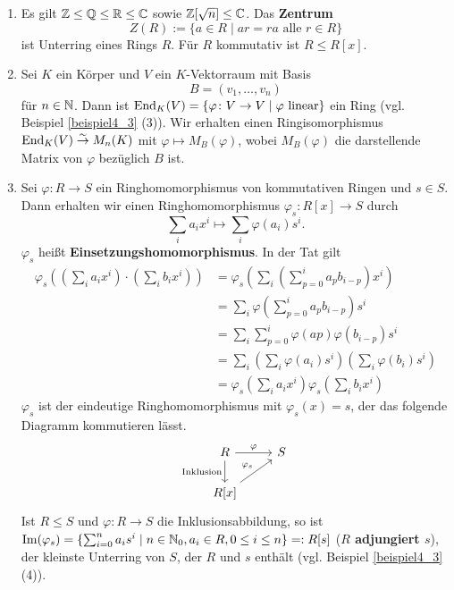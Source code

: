 \begin{beispiel}\label{beispiel4_6}
	\begin{enumerate}[label=(\arabic*)]
		\item Es gilt $\mathbb{Z} \leq \mathbb{Q} \leq \mathbb{R} \leq \mathbb{C}$ sowie $\mathbb{Z}[\sqrt{n}] \leq \mathbb{C}$. Das \textbf{Zentrum} 
		\[Z(R) := \{a \in R \mid ar=ra \text{ alle } r \in R\}\]
		ist Unterring eines Rings $R$. Für $R$ kommutativ ist $R \leq R[x]$.
		\item Sei $K$ ein Körper und $V$ ein $K$-Vektorraum mit Basis
		\[B = (v_1, \dots, v_n)\]
		für $n \in \mathbb{N}$. Dann ist $\mathrm{End}_K(V) = \{\varphi\colon V \to V \mid \varphi \text{ linear}\}$ ein Ring (vgl. Beispiel \ref{beispiel4_3} (3)). Wir erhalten einen Ringisomorphismus $\mathrm{End}_K(V) \overset{\sim}{\to} M_n(K)$ mit $\varphi \mapsto M_B(\varphi)$, wobei $M_B(\varphi)$ die darstellende Matrix von $\varphi$ bezüglich $B$ ist.
		\item Sei $\varphi \colon R \to S$ ein Ringhomomorphismus von kommutativen Ringen und $s \in S$. Dann erhalten wir einen Ringhomomorphismus $\varphi_s \colon R[x] \to S$ durch 
		\[\sum_i a_i x^i \mapsto \sum_i \varphi(a_i)s^i.\]
		$\varphi_s$ heißt \textbf{Einsetzungshomomorphismus}. In der Tat gilt 
		\begin{align*}
			\varphi_s\left( \left(\sum_i a_i x^i\right) \cdot \left(\sum_i b_i x^i\right)\right) &= \varphi_s\left(\sum_i \left(\sum_{p=0}^i a_p b_{i-p}\right)x^i\right)\\
			&= \sum_i \varphi\left(\sum_{p=0}^i a_p b_{i-p}\right) s^i\\
			&= \sum_i \sum_{p=0}^i \varphi(ap)\varphi(b_{i-p}) s^i\\
			&= \sum_i \left(\sum_i \varphi(a_i) s^i\right) \left(\sum_{i} \varphi(b_i) s^i\right)\\
			&= \varphi_s\left(\sum_i a_ix^i\right) \varphi_s\left(\sum_i b_ix^i\right)
		\end{align*}
		$\varphi_s$ ist der eindeutige Ringhomomorphismus mit $\varphi_s(x) = s$, der das folgende Diagramm kommutieren lässt.
		\[
		\begin{tikzcd}
			R \arrow{r}{\varphi} \arrow[swap]{d}{\text{Inklusion}} & S \\
			R[x] \arrow{ur}{\varphi_s}
		\end{tikzcd}
		\]
		Ist $R \leq S$ und $\varphi \colon R \to S$ die Inklusionsabbildung, so ist  $\mathrm{Im}(\varphi_s) = \{\sum_{i=0}^n a_i s^i \mid n \in \mathbb{N}_0, a_i \in R, 0 \leq i \leq n\} =: R[s]$ (\glqq\textbf{$R$ adjungiert $s$}\grqq), der kleinste Unterring von $S$, der $R$ und $s$ enthält (vgl. Beispiel \ref{beispiel4_3} (4)). 
		\vspace{0.5cm}
		

\end{enumerate}
\end{beispiel}
